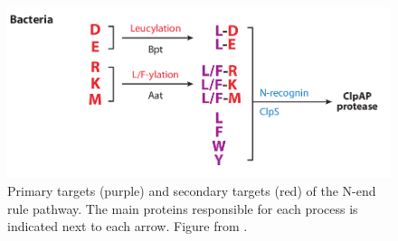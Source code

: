 \begin{figure}[!ht]
	\centering
	\includegraphics[width=0.4\linewidth]{figure/nEndRule}
	\caption{Primary targets (purple) and secondary targets (red) of the N-end rule pathway. The main proteins responsible for each process is indicated next to each arrow. Figure from \citet{tasaki_n-end_2012}.}
	\label{fig:nEndRule}	
\end{figure}

